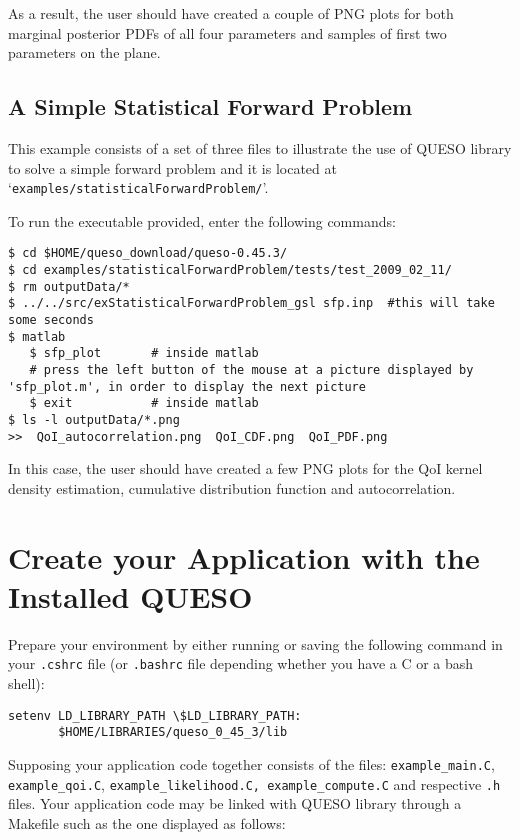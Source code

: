 As a result, the user should have created a couple of PNG plots for both marginal posterior PDFs of all four parameters and samples of first two parameters on the plane.

\subsection{A Simple Statistical Forward Problem}

This example consists of a set of three files to illustrate the use of QUESO library to solve a simple forward problem and it is located at `\texttt{examples/statisticalForwardProblem/}'. %

To run the executable provided, enter the following commands:
\begin{lstlisting}[label={},caption={}]
$ cd $HOME/queso_download/queso-0.45.3/
$ cd examples/statisticalForwardProblem/tests/test_2009_02_11/
$ rm outputData/*
$ ../../src/exStatisticalForwardProblem_gsl sfp.inp  #this will take some seconds
$ matlab
   $ sfp_plot       # inside matlab
   # press the left button of the mouse at a picture displayed by 'sfp_plot.m', in order to display the next picture
   $ exit           # inside matlab
$ ls -l outputData/*.png
>>  QoI_autocorrelation.png  QoI_CDF.png  QoI_PDF.png  
\end{lstlisting}


In this case, the user should have created a few PNG plots for the QoI kernel density estimation, cumulative distribution function and autocorrelation.


\section{Create your Application with the Installed QUESO} \label{sc-use-queso}

Prepare your environment by either running or saving the following command in your \verb+.cshrc+ file (or \verb+.bashrc+ file depending whether you have a C or a bash shell):

\begin{lstlisting}[label={},caption={}]
setenv LD_LIBRARY_PATH \$LD_LIBRARY_PATH:
       $HOME/LIBRARIES/queso_0_45_3/lib
\end{lstlisting}


Supposing your application code together consists of the files: \linebreak \verb+example_main.C+, \verb+example_qoi.C+,  \verb+example_likelihood.C, example_compute.C+ and respective \verb+.h+ files. Your application code may be linked with QUESO library through a Makefile such as the one displayed as follows:

